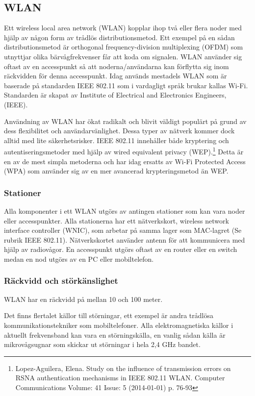 \documentclass[a4paper,12pt,fleqn]{article}
\begin{document}
\subsection{WLAN}
Ett wireless local area network (WLAN) kopplar ihop två eller flera noder med hjälp av någon form av trådlös distributionsmetod. Ett exempel på en sådan distributionsmetod är orthogonal frequency-division multiplexing (OFDM) som utnyttjar olika bärvågfrekvenser får att koda om signalen. WLAN använder sig oftast av en accesspunkt så att noderna/användarna kan förflytta sig inom räckvidden för denna accesspunkt. Idag används mestadels WLAN som är baserade på standarden IEEE 802.11 som i vardagligt språk brukar kallas Wi-Fi. Standarden är skapat av Institute of Electrical and Electronics Engineers, (IEEE).

Användning av WLAN har ökat radikalt och blivit väldigt populärt på grund av dess flexibilitet och användarvänlighet. Dessa typer av nätverk kommer dock alltid med lite säkerhetsrisker. IEEE 802.11 innehåller både kryptering och autentiseringsmetoder med hjälp av wired equivalent privacy (WEP).\footnote{Lopez-Aguilera, Elena. Study on the influence of transmission errors on RSNA authentication mechanisms in IEEE 802.11 WLAN. Computer Communications Volume: 41 Issue: 5 (2014-01-01) p. 76-93} Detta är en av de mest simpla metoderna och har idag ersatts av  Wi-Fi Protected Access (WPA) som använder sig av en mer avancerad krypteringsmetod än WEP.

\subsubsection{Stationer}
Alla komponenter i ett WLAN utgörs av antingen stationer som kan vara noder eller accesspunkter. Alla stationerna har ett nätverkskort, wireless network interface controller (WNIC), som arbetar på samma lager som MAC-lagret (Se rubrik IEEE 802.11). Nätverkskortet använder antenn för att kommunicera med hjälp av radiovågor. En accesspunkt utgörs oftast av en router eller en switch medan en nod utgörs av en PC eller mobiltelefon.

\subsubsection{Räckvidd och störkänslighet}
WLAN har en räckvidd på mellan 10 och 100 meter.

Det finns flertalet källor till störningar, ett exempel är andra trådlösa kommunikationstekniker som mobiltelefoner. Alla elektromagnetiska källor i aktuellt frekvensband kan vara en störningskälla, en vanlig sådan källa är mikrovågsugnar som skickar ut störningar i hela 2,4 GHz bandet.
\end{document}
